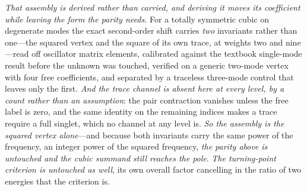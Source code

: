 \documentclass[11pt,a4paper]{article}
\theoremstyle{plain}
\theoremstyle{definition}
\theoremstyle{remark}
\begin{document}
\emph{That assembly is derived rather than carried, and deriving it moves its coefficient while leaving the form
the parity needs.} For a totally symmetric cubic on degenerate modes the exact second-order shift carries
\emph{two} invariants rather than one---the squared vertex and the square of its own trace, at weights two and
nine---read off oscillator matrix elements, calibrated against the textbook single-mode result before the unknown
was touched, verified on a generic two-mode vertex with four free coefficients, and separated by a traceless
three-mode control that leaves only the first. \emph{And the trace channel is absent here at every level, by a
count rather than an assumption}: the pair contraction vanishes unless the free label is zero, and the same
identity on the remaining indices makes a trace require a full singlet, which no channel at any level is. \emph{So
the assembly is the squared vertex alone}---and because both invariants carry the same power of the frequency, an
integer power of the squared frequency, \emph{the parity above is untouched and the cubic summand still reaches the
pole}. \emph{The turning-point criterion is untouched as well}, its own overall factor cancelling in the ratio of
two energies that the criterion
is.
\end{document}
